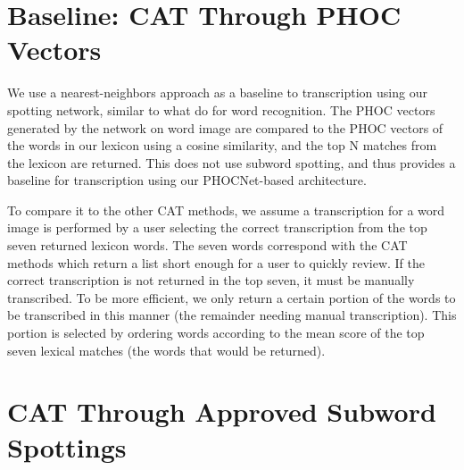 \documentclass[ms,electronic,twosidetoc,letterpaper,chaptercenter,parttop,lof,lot]{byumsphd}
\begin{document}
\section{Baseline: CAT Through PHOC Vectors}
We use a nearest-neighbors approach as a baseline to transcription using our spotting network, similar to what \cite{krishnan2016} do for word recognition. The PHOC vectors generated by the network on word image are compared to the PHOC vectors of the  words in our lexicon using a cosine similarity, and the top N matches from the lexicon are returned. This does not use subword spotting, and thus provides a baseline for transcription using our PHOCNet-based architecture.

To compare it to the other CAT methods, we assume a transcription for a word image is performed by a user selecting the correct transcription from the top seven returned lexicon words. The seven words correspond with the CAT methods which return a list short enough for a user to quickly review. If the correct transcription is not returned in the top seven, it must be manually transcribed.
To be more efficient, we only return a certain portion of the words to be transcribed in this manner (the remainder needing manual transcription). This portion is selected by ordering words according to the mean score of the top seven lexical matches (the words that would be returned).







\section{CAT Through Approved Subword Spottings}
\end{document}
